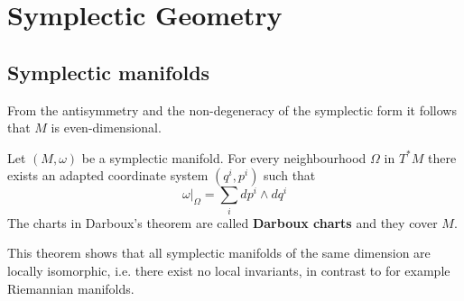 \chapter{Symplectic Geometry}\label{chapter:symplectic}
\section{Symplectic manifolds}

	
	\begin{property}[Dimension]
		From the antisymmetry and the non-degeneracy of the symplectic form it follows that $M$ is even-dimensional.
	\end{property}
	
	\begin{theorem}[Darboux]
		Let $(M, \omega)$ be a symplectic manifold. For every neighbourhood $\Omega$ in $T^*M$ there exists an adapted coordinate system $(q^i, p^i)$ such that
		\begin{equation}
			\left.\omega\right|_\Omega = \sum_idp^i\wedge dq^i
		\end{equation}		
		{\normalfont The charts in Darboux's theorem are called \textbf{Darboux charts} and they cover $M$.}
	\end{theorem}
	\begin{remark}
		This theorem shows that all symplectic manifolds of the same dimension are locally isomorphic, i.e. there exist no local invariants, in contrast to for example Riemannian manifolds.
	\end{remark}
	
